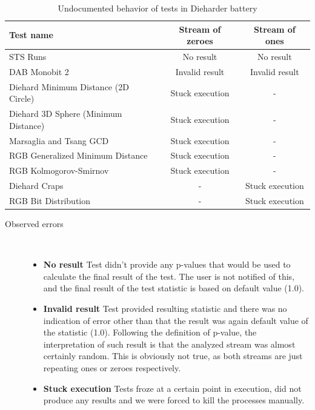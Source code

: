 \documentclass[
  digital,  	%
  color,		%
  oneside,   	%
  12pt,
  nocover,
  notable,
  nolof,
  nolot,
]{fithesis3}
\newenvironment{titlemize}[1]
{
	\begin{description}
	\item[#1]\
	\begin{itemize}
}
{
	\end{itemize}
 	\end{description}
}
\begin{document}
\begin{table}[h!]
\begin{nomar}
\centering
\begin{tabular}{ l || c | c }
\textbf{Test name}                   & \textbf{Stream of zeroes} & \textbf{Stream of ones} \\ \hline \hline
STS Runs                             & No result                & No result                \\ \hline
DAB Monobit 2 						 & Invalid result           & Invalid result           \\ \hline
Diehard Minimum Distance (2D Circle) & Stuck execution          & -                        \\
Diehard 3D Sphere (Minimum Distance) & Stuck execution          & -                        \\
Marsaglia and Tsang GCD              & Stuck execution          & -                        \\
RGB Generalized Minimum Distance     & Stuck execution          & -                        \\
RGB Kolmogorov-Smirnov               & Stuck execution          & -                        \\  
Diehard Craps                        & -                        & Stuck execution          \\
RGB Bit Distribution                 & -                        & Stuck execution          \\
\end{tabular}
\end{nomar}
\caption{Undocumented behavior of tests in Dieharder battery}
\label{tab:dieharder_errors}
\end{table}

\begin{titlemize}{Observed errors}
\item \textbf{No result} Test didn't provide any p-values that would be used to calculate the final result of the test. The user is not notified of this, and the final result of the test statistic is based on default value (1.0).
\item \textbf{Invalid result} Test provided resulting statistic and there was no indication of error other than that the result was again default value of the statistic (1.0). Following the definition of p-value, the interpretation of such result is that the analyzed stream was almost certainly random. This is obviously not true, as both streams are just repeating ones or zeroes respectively. 
\item \textbf{Stuck execution} Tests froze at a certain point in execution, did not produce any results and we were forced to kill the processes manually.
\end{titlemize}
\end{document}
